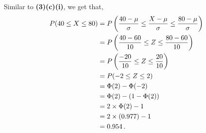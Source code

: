 \begin{subquestions}
\begin{subsubquestions}
Similar to \textbf{(3)(c)(i)}, we get that,
\begin{align}
	P(40 \leq X \leq 80) & = P \left( \frac{40-\mu}{\sigma} \leq \frac{X-\mu}{\sigma} \leq \frac{80-\mu}{\sigma} \right) \nonumber \\
	                     & = P \left( \frac{40-60}{10} \leq Z \leq \frac{80-60}{10} \right) \nonumber \\
	                     & = P \left( \frac{-20}{10} \leq Z \leq \frac{20}{10} \right) \nonumber \\
						 & = P(-2 \leq Z \leq 2) \nonumber \\
						 & = \Phi(2) - \Phi(-2) \nonumber \\
						 & = \Phi(2) - (1 - \Phi(2)) \nonumber \\
						 & = 2 \times \Phi(2) - 1 \nonumber \\
						 & = 2 \times (0.977) - 1 \nonumber \\
						 & = 0.954 \,.
\end{align}


\end{subsubquestions}

\end{subquestions}

